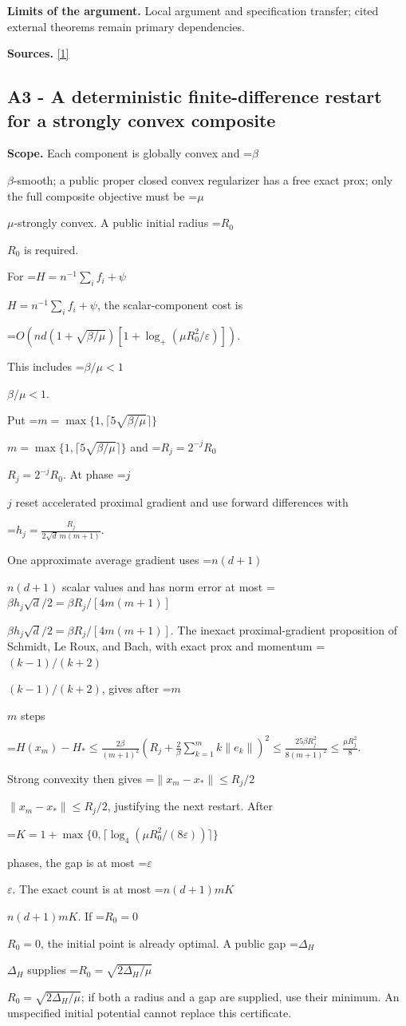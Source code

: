 \documentclass[10pt,a4paper]{article}
\newcommand{\AtlasMath}[1]{\par\begingroup\centering\setbox0=\hbox{$\displaystyle #1$}\ifdim\wd0>1.4\linewidth\typeout{ATLAS WIDE FORMULA: \the\wd0}\fi\ifdim\wd0>\linewidth\resizebox{\linewidth}{!}{\box0}\else\box0\fi\par\endgroup}
\newcommand{\AtlasInlineMath}[1]{\begingroup\setbox0=\hbox{$#1$}\ifdim\wd0>.4\linewidth\endgroup\AtlasMath{#1}\else\endgroup$#1$\fi}
\begin{document}
\textbf{Limits of the argument.} Local argument and specification transfer; cited external theorems remain primary dependencies.

\textbf{Sources.} \href{https://arxiv.org/html/2610.00345v1}{[1]}

\subsection{A3 - A deterministic finite-difference restart for a strongly convex composite}
\textbf{Scope.} Each component is globally convex and \AtlasInlineMath{\beta}-smooth; a public proper closed convex regularizer has a free exact prox; only the full composite objective must be \AtlasInlineMath{\mu}-strongly convex. A public initial radius \AtlasInlineMath{R_0} is required.

For \AtlasInlineMath{H=n^{-1}\sum_i f_i+\psi}, the scalar-component cost is

\AtlasMath{O\!\left(nd(1+\sqrt{\beta/\mu})[1+\log_+(\mu R_0^2/\varepsilon)]\right).}

This includes \AtlasInlineMath{\beta/\mu<1}.

Put \AtlasInlineMath{m=\max\{1,\lceil5\sqrt{\beta/\mu}\rceil\}} and \AtlasInlineMath{R_j=2^{-j}R_0}. At phase \AtlasInlineMath{j} reset accelerated proximal gradient and use forward differences with

\AtlasMath{h_j=\frac{R_j}{2\sqrt d\,m(m+1)}.}

One approximate average gradient uses \AtlasInlineMath{n(d+1)} scalar values and has norm error at most \AtlasInlineMath{\beta h_j\sqrt d/2=\beta R_j/[4m(m+1)]}. The inexact proximal-gradient proposition of Schmidt, Le Roux, and Bach, with exact prox and momentum \AtlasInlineMath{(k-1)/(k+2)}, gives after \AtlasInlineMath{m} steps

\AtlasMath{H(x_m)-H_*\le\frac{2\beta}{(m+1)^2}\left(R_j+\frac2\beta\sum_{k=1}^m k\|e_k\|\right)^2\le\frac{25\beta R_j^2}{8(m+1)^2}\le\frac{\mu R_j^2}{8}.}

Strong convexity then gives \AtlasInlineMath{\|x_m-x_*\|\le R_j/2}, justifying the next restart. After

\AtlasMath{K=1+\max\{0,\lceil\log_4(\mu R_0^2/(8\varepsilon))\rceil\}}

phases, the gap is at most \AtlasInlineMath{\varepsilon}. The exact count is at most \AtlasInlineMath{n(d+1)mK}. If \AtlasInlineMath{R_0=0}, the initial point is already optimal. A public gap \AtlasInlineMath{\Delta_H} supplies \AtlasInlineMath{R_0=\sqrt{2\Delta_H/\mu}}; if both a radius and a gap are supplied, use their minimum. An unspecified initial potential cannot replace this certificate.
\end{document}

